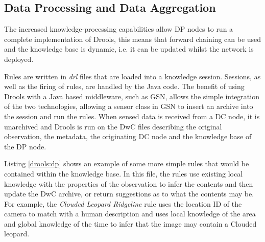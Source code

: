 		
	
	\subsection{Data Processing and Data Aggregation}
		The increased knowledge-processing capabilities allow DP nodes to run a complete implementation of Drools, this means that forward chaining can be used and the knowledge base is dynamic, i.e. it can be updated whilst the network is deployed. 
		
		Rules are written in \textit{drl} files that are loaded into a knowledge session. Sessions, as well as the firing of rules, are handled by the Java code. The benefit of using Drools with a Java based middleware, such as GSN, allows the simple integration of the two technologies, allowing a sensor class in GSN to insert an archive into the session and run the rules. When sensed data is received from a DC node, it is unarchived and Drools is run on the DwC files describing the original observation, the metadata, the originating DC node and the knowledge base of the DP node.
		
		Listing \ref{drools:dp} shows an example of some more simple rules that would be contained within the knowledge base. In this file, the rules use existing local knowledge with the properties of the observation to infer the contents and then update the DwC archive, or return suggestions as to what the contents may be. For example, the \textit{Clouded Leopard Ridgeline} rule uses the location ID of the camera to match with a human description and uses local knowledge of the area and global knowledge of the time to infer that the image may contain a Clouded leopard.
		

